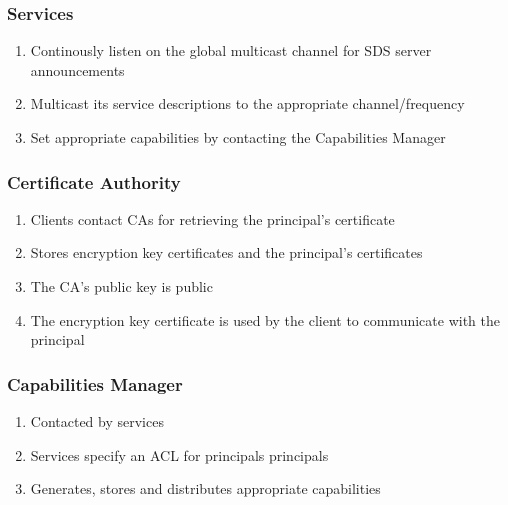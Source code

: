 \documentclass{beamer}
\begin{document}

\begin{frame} %
\frametitle{Services}
\begin{enumerate}
\item \alert<+>{Continously listen on the global multicast channel for SDS server announcements}
\item \alert<+>{Multicast its service descriptions to the appropriate channel/frequency}
\item \alert<+>{Set appropriate capabilities by contacting the Capabilities Manager}
\end{enumerate}
\end{frame}


\begin{frame} %
\frametitle{Certificate Authority}
\begin{enumerate}
\item \alert<+>{Clients contact CAs for retrieving the principal's certificate}
\item \alert<+>{Stores encryption key certificates and the principal's certificates}
\item \alert<+>{The CA's public key is public}
\item \alert<+>{The encryption key certificate is used by the client to communicate with the principal}
\end{enumerate}
\end{frame}


\begin{frame} %
\frametitle{Capabilities Manager}
\begin{enumerate}
\item \alert<+>{Contacted by services}
\item \alert<+>{Services specify an ACL for principals principals}
\item \alert<+>{Generates, stores and distributes appropriate capabilities}
\end{enumerate}
\end{frame}
\end{document}
